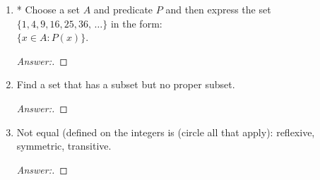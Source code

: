 \documentclass[10pt]{article}
\begin{document}
\begin{enumerate}
Using these predicates, write each of the following statements as a sentence in first-order logic:
\begin{enumerate}
\item
$\mathsf{A}$ is the only upper case English character that is a vowel and that can be written in three strokes but does not occur in the string $\mathsf{STUPID}$.
\begin{proof}[Answer:]
\end{proof}
\item
There is an upper case English character strictly between $\mathsf{K}$ and $\mathsf{R}$ that can be written in one stroke.
\begin{proof}[Answer:]
\end{proof}
\end{enumerate}



\item
* Choose a set $A$ and predicate $P$ and then express the set $\{1, 4, 9, 16, 25, 36, \, \ldots \}$ in the form: \\
$\{x \in A : P(x)\}$.
\begin{proof}[Answer:]
\end{proof}



\item
Find a set that has a subset but no proper subset.
\begin{proof}[Answer:]
\end{proof}



\addtocounter{enumi}{1}
\item
Not equal (defined on the integers is (circle all that apply): reflexive, symmetric, transitive. 
\begin{proof}[Answer:]
\end{proof}



\end{enumerate}
\end{document}
